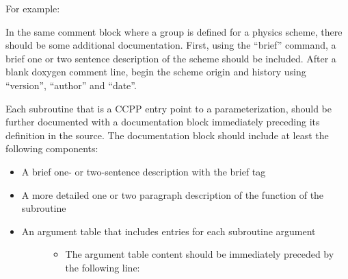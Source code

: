 \documentclass[letterpaper,10pt,english]{sphinxmanual}
\begin{document}
\begin{sphinxVerbatim}[commandchars=\\\{\}]
\end{sphinxVerbatim}

For example:

\begin{sphinxVerbatim}[commandchars=\\\{\}]
\end{sphinxVerbatim}

In the same comment block where a group is defined for a physics scheme,
there should be some additional documentation. First, using the “brief”
command, a brief one or two sentence description of the scheme should be
included. After a blank doxygen comment line, begin the scheme origin
and history using “version”, “author” and “date”.

Each subroutine that is a CCPP entry point to a parameterization, should
be further documented with a documentation block immediately preceding
its definition in the source. The documentation block should include at
least the following components:
\begin{itemize}
\item {} 
A brief one- or two-sentence description with the brief tag

\item {} 
A more detailed one or two paragraph description of the function of the subroutine

\item {} \begin{description}
\item[{An argument table that includes entries for each subroutine argument}] \leavevmode\begin{itemize}
\item {} 
The argument table content should be immediately preceded by the following line:

\end{itemize}

\end{description}

\end{itemize}
\end{document}
